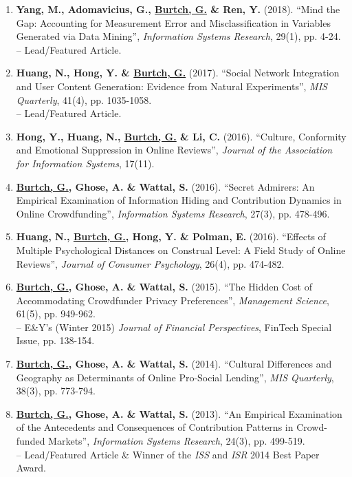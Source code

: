 \documentclass[10.5pt,letterpaper,sans]{moderncv}        %
\begin{document}
\begin{enumerate}[leftmargin=!,labelindent=5pt,itemindent=-15pt]
\item \textbf{Yang, M., Adomavicius, G., \underline{Burtch, G.} \& Ren, Y.} (2018). ``Mind the Gap: Accounting for Measurement Error and Misclassification in Variables Generated via Data Mining'', \textit{Information Systems Research}, 29(1), pp. 4-24. \\-- Lead/Featured Article.

\item \textbf{Huang, N., Hong, Y. \& \underline{Burtch, G.}} (2017). ``Social Network Integration and User Content Generation: Evidence from Natural Experiments'', \textit{MIS Quarterly}, 41(4), pp. 1035-1058. \\-- Lead/Featured Article.

\item \textbf{Hong, Y., Huang, N., \underline{Burtch, G.} \& Li, C.} (2016). ``Culture, Conformity and Emotional Suppression in Online Reviews'', \textit{Journal of the Association for Information Systems}, 17(11).

\item \textbf{\underline{Burtch, G.}, Ghose, A. \& Wattal, S.} (2016). ``Secret Admirers: An Empirical Examination of Information Hiding and Contribution Dynamics in Online Crowdfunding'', \textit{Information Systems Research}, 27(3), pp. 478-496.

\item \textbf{Huang, N., \underline{Burtch, G.}, Hong, Y. \& Polman, E.} (2016). ``Effects of Multiple Psychological Distances on Construal Level: A Field Study of Online Reviews'', \textit{Journal of Consumer Psychology}, 26(4), pp. 474-482.

\item \textbf{\underline{Burtch, G.}, Ghose, A. \& Wattal, S.} (2015). ``The Hidden Cost of Accommodating Crowdfunder Privacy Preferences'', \textit{Management Science}, 61(5), pp. 949-962. \\-- E\&Y's (Winter 2015) \textit{Journal of Financial Perspectives}, FinTech Special Issue, pp. 138-154.

\item \textbf{\underline{Burtch, G.}, Ghose, A. \& Wattal, S.} (2014). ``Cultural Differences and Geography as Determinants of Online Pro-Social Lending'', \textit{MIS Quarterly}, 38(3), pp. 773-794.

\item \textbf{\underline{Burtch, G.}, Ghose, A. \& Wattal, S.} (2013). ``An Empirical Examination of the Antecedents and Consequences of Contribution Patterns in Crowd-funded Markets'', \textit{Information Systems Research}, 24(3), pp. 499-519. \\-- Lead/Featured Article \& Winner of the \textit{ISS} and \textit{ISR} 2014 Best Paper Award.

\end{enumerate}
\end{document}
